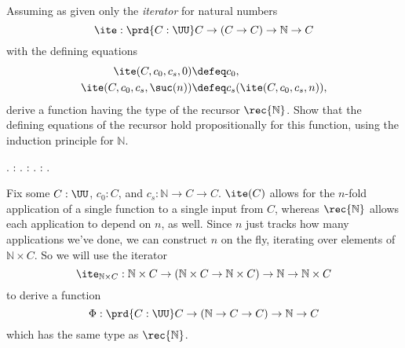Assuming as given only the \textit{iterator} for natural numbers
\[
\ite : 
\prd{C:\UU} C \to (C \to C) \to \mathbb{N} \to C
\]
with the defining equations
\begin{align*}
\ite(C, c_{0}, c_{s}, 0) &\defeq c_{0}, \\
\ite(C, c_{0}, c_{s}, \suc(n)) &\defeq c_{s}(\ite(C, c_{0}, c_{s}, n)),
\end{align*}
derive a function having the type of the recursor $\rec{\mathbb{N}}$.  Show
that the defining equations of the recursor hold propositionally for this
function, using the induction principle for $\mathbb{N}$. \begin{coqdoccode}
\coqdocemptyline
\coqdocnoindent
{} .\coqdoceol
\coqdocemptyline
\coqdocnoindent
{}  : .\coqdoceol
\coqdocnoindent
{}  : .\coqdoceol
\coqdocnoindent
{}  :     .\coqdoceol
\coqdocemptyline
\end{coqdoccode}
\soln  
Fix some $C : \UU$, $c_{0} : C$, and $c_{s} : \mathbb{N} \to C \to C$.
$\ite(C)$ allows for the $n$-fold application of a single function to a single
input from $C$, whereas $\rec{\mathbb{N}}$ allows each application to depend on
$n$, as well.  Since $n$ just tracks how many applications we've done, we can
construct $n$ on the fly, iterating over elements of $\mathbb{N} \times C$.  So
we will use the iterator
\[
\ite_{\mathbb{N} \times C} : \mathbb{N} \times C \to (\mathbb{N} \times C
\to \mathbb{N} \times C) \to \mathbb{N} \to \mathbb{N} \times C
\]
to derive a function
\[
\Phi : \prd{C : \UU} C \to (\mathbb{N} \to C \to C) \to
\mathbb{N} \to C
\]
which has the same type as $\rec{\mathbb{N}}$.  


